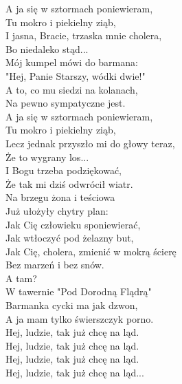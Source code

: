 A ja się w sztormach poniewieram, \\
Tu mokro i piekielny ziąb, \\
I jasna, Bracie, trzaska mnie cholera, \\
Bo niedaleko stąd... \\

Mój kumpel mówi do barmana: \\
"Hej, Panie Starszy, wódki dwie!" \\
A to, co mu siedzi na kolanach, \\
Na pewno sympatyczne jest. \\

A ja się w sztormach poniewieram, \\
Tu mokro i piekielny ziąb, \\
Lecz jednak przyszło mi do głowy teraz, \\
Że to wygrany los... \\

I Bogu trzeba podziękować, \\
Że tak mi dziś odwrócił wiatr. \\
Na brzegu żona i teściowa \\
Już ułożyły chytry plan: \\

Jak Cię człowieku sponiewierać, \\
Jak wtłoczyć pod żelazny but, \\
Jak Cię, cholera, zmienić w mokrą ścierę \\
Bez marzeń i bez snów. \\

A tam? \\

W tawernie "Pod Dorodną Flądrą" \\
Barmanka cycki ma jak dzwon, \\
A ja mam tylko świerszczyk porno. \\
Hej, ludzie, tak już chcę na ląd. \\
Hej, ludzie, tak już chcę na ląd. \\
Hej, ludzie, tak już chcę na ląd. \\
Hej, ludzie, tak już chcę na ląd...